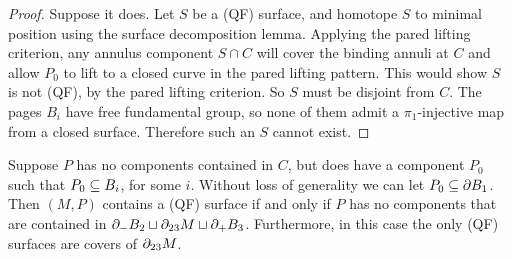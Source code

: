 \begin{proof}

Suppose it does. Let $S$ be a (QF) surface, and homotope $S$ to minimal
position using the surface decomposition lemma. Applying the pared lifting
criterion, any annulus component $S \cap C$ will cover the binding annuli at
$C$ and allow $P_0$ to lift to a closed curve in the pared lifting pattern.
This would show $S$ is not (QF), by the pared lifting criterion. So $S$ must be
disjoint from $C$.  The pages $B_i$ have free fundamental group, so none of
them admit a $\pi_1$-injective map from a closed surface.  Therefore such an
$S$ cannot exist.

\end{proof}

\begin{prop}

Suppose $P$ has no components contained in $C$, but does have a component $P_0$
such that $P_0 \subseteq B_i$, for some $i$.  Without loss of generality we can let
$P_0 \subseteq \partial B_1$.  Then $(M,P)$ contains a (QF) surface if and only if $P$
has no components that are contained in $\partial_-B_2 \sqcup \partial_{23}M \sqcup
\partial_+B_3$. Furthermore, in this case the only (QF) surfaces are covers of
$\partial_{23}M$.

\end{prop}

